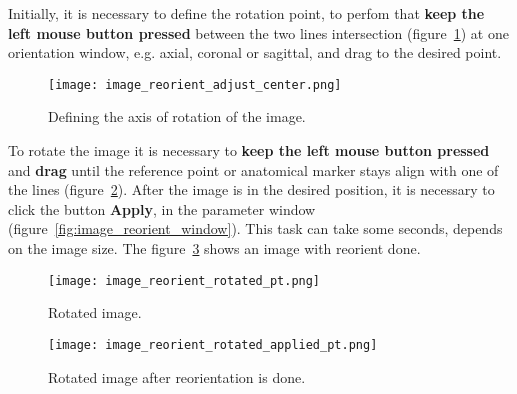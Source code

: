 Initially, it is necessary to define the rotation point, to perfom that \textbf{keep the left mouse button pressed} between the two lines intersection (figure~\ref{fig:image_reorient_adjust_center}) at one orientation window, e.g. axial, coronal or sagittal, and drag to the desired point.

\begin{figure}[!htb]
\centering
\texttt{[image: image\_reorient\_adjust\_center.png]}
\caption{Defining the axis of rotation of the image.}
\label{fig:image_reorient_adjust_center}
\end{figure}

To rotate the image it is necessary to \textbf{keep the left mouse button pressed} and \textbf{drag} until the reference point or anatomical marker stays align with one of the lines (figure~\ref{fig:image_reorient_rotated}). After the image is in the desired position, it is necessary to click the button \textbf{Apply}, in the parameter window (figure~\ref{fig:image_reorient_window}). This task can take some seconds, depends on the image size. The figure~\ref{fig:image_reorient_rotated_applied} shows an image with reorient done.

\begin{figure}[!htb]
\centering
\texttt{[image: image\_reorient\_rotated\_pt.png]}
\caption{Rotated image.}
\label{fig:image_reorient_rotated}
\end{figure}

\begin{figure}[!htb]
\centering
\texttt{[image: image\_reorient\_rotated\_applied\_pt.png]}
\caption{Rotated image after reorientation is done.}
\label{fig:image_reorient_rotated_applied}
\end{figure}
